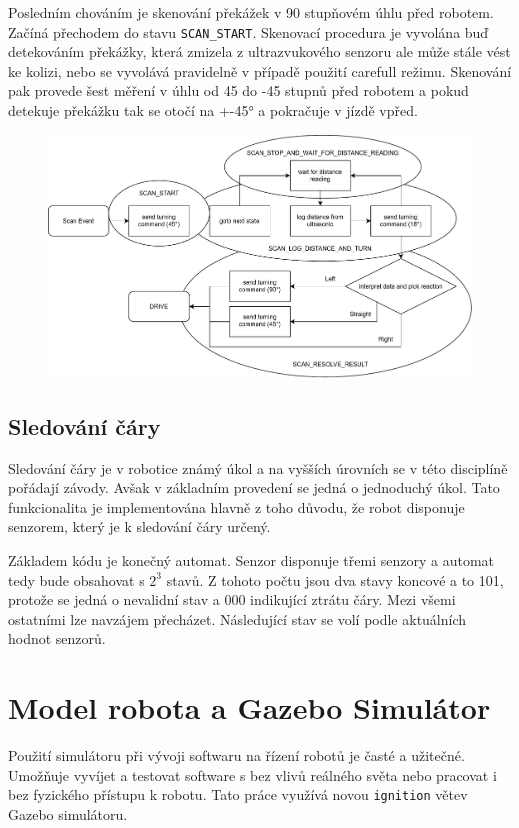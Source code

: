Posledním chováním je skenování překážek v 90 stupňovém úhlu před robotem. Začíná přechodem do stavu \verb|SCAN_START|. Skenovací procedura je vyvolána buď detekováním překážky, která zmizela z ultrazvukového senzoru ale může stále vést ke kolizi, nebo se vyvolává pravidelně v případě použití carefull režimu. Skenování pak provede šest měření v úhlu od 45 do -45 stupnů před robotem a pokud detekuje překážku tak se otočí na +-45° a pokračuje v jízdě vpřed.

\begin{figure}[h!]
	\centering
	\includegraphics[scale=0.75]{obrazky-figures/wandering_scan_diagram.pdf}
	\caption{}
	\label{}
\end{figure}

\subsection*{Sledování čáry}
Sledování čáry je v robotice známý úkol a na vyšších úrovních se v této disciplíně pořádají závody. Avšak v základním provedení se jedná o jednoduchý úkol. Tato funkcionalita je implementována hlavně z toho důvodu, že robot disponuje senzorem, který je k sledování čáry určený.

Základem kódu je konečný automat. Senzor disponuje třemi senzory a automat tedy bude obsahovat s $2^3$ stavů. Z tohoto počtu jsou dva stavy koncové a to 101, protože se jedná o nevalidní stav a 000 indikující ztrátu čáry. Mezi všemi ostatními lze navzájem přecházet. Následující stav se volí podle aktuálních hodnot senzorů.

\section{Model robota a Gazebo Simulátor}
Použití simulátoru při vývoji softwaru na řízení robotů je časté a užitečné. Umožňuje vyvíjet a testovat software s bez vlivů reálného světa nebo pracovat i bez fyzického přístupu k robotu. Tato práce využívá novou \verb|ignition| větev Gazebo simulátoru.

